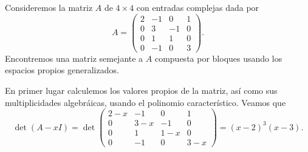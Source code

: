 \begin{example}
  Consideremos la matriz $A$ de $4\times 4$ con entradas complejas dada por
    \[
      A = \begin{pmatrix}
        2 & -1 & 0 & 1 \\
        0 & 3 & -1 & 0 \\
        0 & 1 & 1 & 0 \\
        0 & -1 & 0 & 3
      \end{pmatrix}.
    \]
  Encontremos una matriz semejante a $A$ compuesta por bloques usando los espacios propios generalizados.

  \examplesolution

  En primer lugar calculemos los valores propios de la matriz, así como sus multiplicidades algebráicas, usando el polinomio característico. Veamos que
  \[
    \det(A-xI) = \det\begin{pmatrix}
      2-x & -1 & 0 & 1 \\
      0 & 3-x & -1 & 0 \\
      0 & 1 & 1-x & 0 \\
      0 & -1 & 0 & 3-x
    \end{pmatrix}
      = (x-2)^3 (x-3).
  \] 


\end{example}
